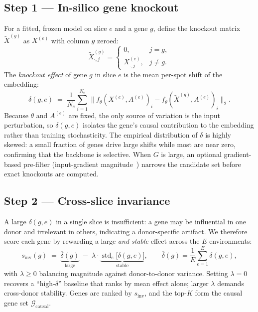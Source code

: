 \documentclass[11pt]{article}
\newcommand{\dinv}{s_{\mathrm{inv}}}
\newcommand{\Gcausal}{\mathcal{G}_{\text{causal}}}
\begin{document}
\subsection{Step 1 --- In-silico gene knockout}
For a fitted, frozen model on slice $e$ and a gene $g$, define the knockout
matrix $\tilde{X}^{(g)}$ as $X^{(e)}$ with column $g$ zeroed:
\begin{equation}
\tilde{X}^{(g)}_{\cdot,j} =
\begin{cases}
0, & j = g,\\
X^{(e)}_{\cdot,j}, & j \neq g.
\end{cases}
\end{equation}
The \emph{knockout effect} of gene $g$ in slice $e$ is the mean per-spot shift of
the embedding:
\begin{equation}
\delta(g,e) \;=\; \frac{1}{N_e} \sum_{i=1}^{N_e}
\bigl\| f_\theta(X^{(e)}, A^{(e)})_i - f_\theta(\tilde{X}^{(g)}, A^{(e)})_i \bigr\|_2 .
\label{eq:delta}
\end{equation}
Because $\theta$ and $A^{(e)}$ are fixed, the only source of variation is the
input perturbation, so $\delta(g,e)$ isolates the gene's causal contribution to
the embedding rather than training stochasticity. The empirical distribution of
$\delta$ is highly skewed: a small fraction of genes drive large shifts while
most are near zero, confirming that the backbone is selective. When $G$ is large,
an optional gradient-based pre-filter (input-gradient magnitude~\citep{sundararajan2017})
narrows the candidate set before exact knockouts are computed.

\subsection{Step 2 --- Cross-slice invariance}
A large $\delta(g,e)$ in a single slice is insufficient: a gene may be
influential in one donor and irrelevant in others, indicating a donor-specific
artifact. We therefore score each gene by rewarding a large \emph{and stable}
effect across the $E$ environments:
\begin{equation}
\dinv(g) \;=\;
\underbrace{\overline{\delta}(g)}_{\text{large}}
\;-\;
\lambda \cdot \underbrace{\operatorname{std}_e\!\bigl[\delta(g,e)\bigr]}_{\text{stable}},
\qquad
\overline{\delta}(g) = \frac{1}{E}\sum_{e=1}^{E}\delta(g,e),
\label{eq:sinv}
\end{equation}
with $\lambda \ge 0$ balancing magnitude against donor-to-donor variance. Setting
$\lambda = 0$ recovers a ``high-$\delta$'' baseline that ranks by mean effect
alone; larger $\lambda$ demands cross-donor stability. Genes are ranked by
$\dinv$, and the top-$K$ form the causal gene set $\Gcausal$.
\end{document}
